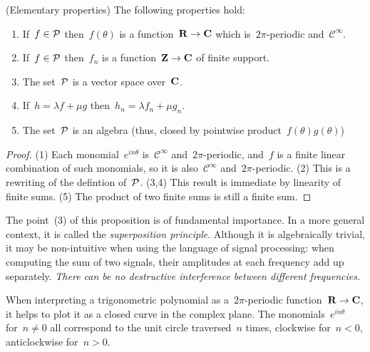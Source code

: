\begin{proposition}
(Elementary properties)
The following properties hold:
\begin{enumerate}
	\item If~$f\in\mathcal{P}$ then~$f(\theta)$ is a
		function~$\mathbf{R}\to\mathbf{C}$ which is~$2\pi$-periodic
		and~$\mathcal{C}^\infty$.
	\item If~$f\in\mathcal{P}$ then~$f_n$ is a function~$\mathbf{Z}\to\mathbf{C}$ of finite
		support.
	\item The set~$\mathcal{P}$ is a vector space over~$\mathbf{C}$.
	\item If~$h=\lambda f+\mu g$ then~$h_n=\lambda f_n+\mu g_n$.
	\item The set~$\mathcal{P}$ is an algebra (thus, closed by
		pointwise product~$f(\theta)g(\theta)$)
\end{enumerate}
\end{proposition}

\begin{proof}
(1) Each monomial~$e^{in\theta}$ is~$\mathcal{C}^\infty$
	and~$2\pi$-periodic, and~$f$ is a finite linear
	combination of such monomials, so it is
	also~$\mathcal{C}^\infty$ and~$2\pi$-periodic.
(2) This is a rewriting of the defintion of~$\mathcal{P}$.
(3,4) This result is immediate by linearity of finite sums.
(5) The product of two finite sums is still a finite sum.
\end{proof}

The point~(3) of this proposition is of fundamental importance.  In a more
general context, it is called the \emph{superposition principle}.  Although it
is algebraically trivial, it may be non-intuitive when using the language of
signal processing: when computing the sum of two signals, their amplitudes at
each frequency add up separately. \emph{There can be no destructive
interference between different frequencies.}


When interpreting a trigonometric polynomial as a~$2\pi$-periodic
function~$\mathbf{R}\to\mathbf{C}$, it helps to plot it as a closed curve in the complex
plane.  The monomials~$e^{in\theta}$ for~$n\neq 0$ all correspond to the unit
circle traversed~$n$ times, clockwise for~$n<0$, anticlockwise for~$n>0$.

